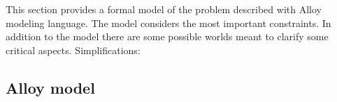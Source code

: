 
This section provides a formal model of the problem described with Alloy modeling language. 
The model considers the most important constraints. In addition to the model there are some 
possible worlds meant to clarify some critical aspects.
Simplifications: 

\subsection{Alloy model}

    
